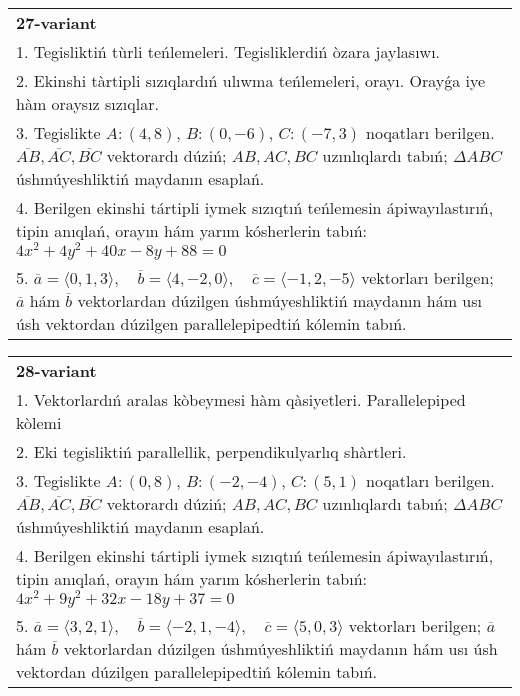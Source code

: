 \documentclass{article}
\begin{document}
\begin{tabular}{m{17cm}}
\textbf{27-variant}\\
1. Tegisliktiń tùrli teńlemeleri. Tegisliklerdiń òzara jaylasıwı.\\

2. Ekinshi tàrtipli sızıqlardıń ulıwma teńlemeleri, orayı. Orayǵa iye hàm oraysız sızıqlar.\\

3. Tegislikte $A: (4, 8)$, $B: (0, -6)$, $C: (-7, 3)$ noqatları berilgen. $\overline{AB}, \overline{AC}, \overline{BC}$ vektorardı dúziń; $AB, AC, BC$ uzınlıqlardı tabıń; $\Delta ABC$ úshmúyeshliktiń maydanın esaplań. \\

4. Berilgen ekinshi tártipli iymek sızıqtıń teńlemesin ápiwayılastırıń, tipin anıqlań, orayın hám yarım kósherlerin tabıń: $4x^2+4y^2+40x-8y+88=0$\\

5. \(\overline{a} = \langle 0, 1, 3 \rangle, \quad \overline{b} = \langle 4, -2, 0 \rangle, \quad \overline{c} = \langle -1, 2, -5 \rangle\) vektorları berilgen; \(\overline{a}\) hám \(\overline{b}\) vektorlardan dúzilgen úshmúyeshliktiń maydanın hám usı úsh vektordan dúzilgen parallelepipedtiń kólemin tabıń.
\end{tabular}
\vspace{1cm}


\begin{tabular}{m{17cm}}
\textbf{28-variant}\\
1. Vektorlardıń aralas kòbeymesi hàm qàsiyetleri. Parallelepiped kòlemi\\

2. Eki tegisliktiń parallellik, perpendikulyarlıq shàrtleri.\\

3. Tegislikte $A: (0, 8)$, $B: (-2, -4)$, $C: (5, 1)$ noqatları berilgen. $\overline{AB}, \overline{AC}, \overline{BC}$ vektorardı dúziń; $AB, AC, BC$ uzınlıqlardı tabıń; $\Delta ABC$ úshmúyeshliktiń maydanın esaplań. \\

4. Berilgen ekinshi tártipli iymek sızıqtıń teńlemesin ápiwayılastırıń, tipin anıqlań, orayın hám yarım kósherlerin tabıń: $4x^2+9y^2+32x-18y+37=0$\\

5. \(\overline{a} = \langle 3, 2, 1 \rangle, \quad \overline{b} = \langle -2, 1, -4 \rangle, \quad \overline{c} = \langle 5, 0, 3 \rangle\) vektorları berilgen; \(\overline{a}\) hám \(\overline{b}\) vektorlardan dúzilgen úshmúyeshliktiń maydanın hám usı úsh vektordan dúzilgen parallelepipedtiń kólemin tabıń.
\end{tabular}
\vspace{1cm}
\end{document}
